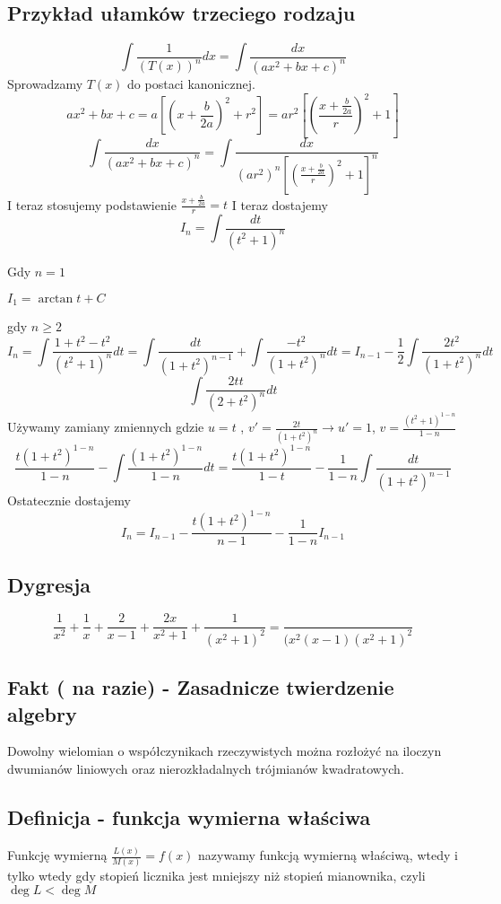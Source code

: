 \documentclass[11pt]{article}
\begin{document}
\subsection{Przykład ułamków trzeciego rodzaju}
$$\int \frac{1}{(T(x))^n}dx = \int \frac{dx}{(ax^2 + bx + c)^n} $$
Sprowadzamy $T(x)$ do postaci kanonicznej. 
$$ax^2 + bx + c = a\left[\left(x+\frac{b}{2a}\right)^2 + r^2\right]  =  ar^2 \left[\left(\frac{x + \frac{b}{2a}}{r}\right)^2 + 1\right]$$
$$\int \frac{dx}{(ax^2 + bx + c)^n} = \int \frac{dx}{(ar^2)^n\left[\left(\frac{x + \frac{b}{2a}}{r}\right)^2 + 1\right]^n} $$
I teraz stosujemy podstawienie $\frac{x+\frac{b}{2a}}{r} = t$
I teraz dostajemy
$$I_n = \int \frac{dt}{(t^2+1)^n}$$

Gdy $n = 1$ \bigskip

$I_1 = \arctan{t} + C$

\bigskip
gdy $n \geq 2$
$$I_n = \int \frac{1+t^2 - t^2}{(t^2+1)^n}dt = \int \frac{dt}{(1+t^2)^{n-1}} + \int \frac{-t^2}{(1+t^2)^n}dt = I_{n-1} - \frac{1}{2} \int \frac{2t^2}{(1+t^2)^n}dt $$
$$\int \frac{2t t}{(2+t^2)^n}dt$$
Używamy zamiany zmiennych gdzie $ u = t$ , $v' = \frac{2t}{(1+t^2)^n} \to u' = 1$, $v = \frac{(t^2+1)^{1-n}}{1-n}$
$$\frac{t(1+t^2)^{1-n}}{1-n} - \int \frac{(1+t^2)^{1-n}}{1-n}dt  = \frac{t(1+t^2)^{1-n}}{1-t} - \frac{1}{1-n}\int\frac{dt}{(1+t^2)^{n-1}}$$
Ostatecznie dostajemy
$$I_n = I_{n-1} - \frac{t(1+t^2)^{1-n}}{n-1} - \frac{1}{1-n}I_{n-1} $$

\subsection{Dygresja}
$$\frac{1}{x^2} + \frac{1}{x} + \frac{2}{x-1} + \frac{2x}{x^2+1} + \frac{1}{(x^2 +1)^2} = \frac{}{(x^2(x-1)(x^2+1)^2}$$
\subsection{Fakt ( na razie) - Zasadnicze twierdzenie algebry}
Dowolny wielomian o współczynikach rzeczywistych można rozłożyć na iloczyn dwumianów liniowych oraz nierozkładalnych trójmianów kwadratowych.

\subsection{Definicja - funkcja wymierna właściwa}
Funkcję wymierną $\frac{L(x)}{M(x)} = f(x)$ nazywamy funkcją wymierną właściwą, wtedy i tylko wtedy gdy stopień licznika jest mniejszy niż stopień mianownika, czyli $ \deg L < \deg M $
\end{document}

